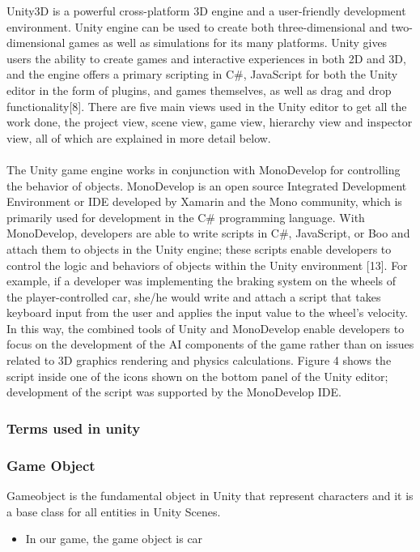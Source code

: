 \documentclass[12pt,a4paper]{article}
\begin{document}
\begin{center}
\begin{center}
Unity3D is a powerful cross-platform 3D engine and a user-friendly development environment. Unity  engine can be used to create both three-dimensional and two-dimensional games as well as simulations for its many platforms. Unity gives users the ability to create games and interactive experiences in both 2D and 3D, and the engine offers a primary scripting in C#, JavaScript for both the Unity editor in the form of plugins, and games themselves, as well as drag and drop functionality[8]. 
There are five main views used in the Unity editor to get all the work done, the project view, scene view, game view, hierarchy view and inspector view, all of which are explained in more detail below.\\
\\
The Unity game engine works in conjunction with MonoDevelop for controlling the behavior of objects. MonoDevelop is an open source Integrated Development Environment or IDE developed by Xamarin and the Mono community, which is primarily used for development in the C# programming language. With MonoDevelop, developers are able to write scripts in C#, JavaScript, or Boo and attach them to objects in the Unity engine; these scripts enable developers to control the logic and behaviors of objects within the Unity environment [13]. For example, if a developer was implementing the braking system on the wheels of the player-controlled car, she/he would write and attach a script that takes keyboard input from the user and applies the input value to the wheel’s velocity. In this way, the combined tools of Unity and MonoDevelop enable developers to focus on the development of the AI components of the game rather than on issues related to 3D graphics rendering and physics calculations. Figure 4 shows the script inside one of the icons shown on the bottom panel of the Unity editor; development of the script was supported by the MonoDevelop IDE.

\subsubsection{Terms used in unity}
\subsubsection*{Game Object}
Gameobject is the fundamental object in Unity that represent characters and it is a base class for all entities in Unity Scenes.
\begin{itemize}
\item 
In our game, the game object is car
\end{itemize}


\end{center}
\end{center}
\end{document}
